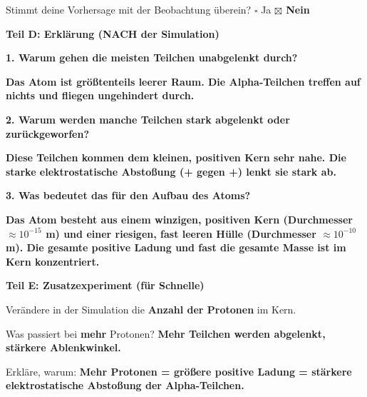 \documentclass[10pt, a4paper]{article}
\newcommand{\fachfarbe}{physik}
\newcommand{\lsg}[1]{\textcolor{loesung}{\textbf{#1}}}
\newcommand{\abschnitt}[1]{%
    \vspace{8pt}
    \noindent\textbf{\textcolor{\fachfarbe}{#1}}
    \vspace{4pt}
}
\begin{document}
\vspace{8pt}

Stimmt deine Vorhersage mit der Beobachtung überein? $\square$ Ja \quad \lsg{$\boxtimes$ Nein}

\vspace{8pt}


\abschnitt{Teil D: Erklärung (NACH der Simulation)}

\textbf{1. Warum gehen die meisten Teilchen unabgelenkt durch?}

\vspace{4pt}
\lsg{Das Atom ist größtenteils leerer Raum. Die Alpha-Teilchen treffen auf nichts und fliegen ungehindert durch.}

\vspace{8pt}

\textbf{2. Warum werden manche Teilchen stark abgelenkt oder zurückgeworfen?}

\vspace{4pt}
\lsg{Diese Teilchen kommen dem kleinen, positiven Kern sehr nahe. Die starke elektrostatische Abstoßung (+ gegen +) lenkt sie stark ab.}

\vspace{8pt}

\textbf{3. Was bedeutet das für den Aufbau des Atoms?}

\vspace{4pt}
\lsg{Das Atom besteht aus einem winzigen, positiven Kern (Durchmesser $\approx 10^{-15}$ m) und einer riesigen, fast leeren Hülle (Durchmesser $\approx 10^{-10}$ m). Die gesamte positive Ladung und fast die gesamte Masse ist im Kern konzentriert.}

\vspace{12pt}


\abschnitt{Teil E: Zusatzexperiment (für Schnelle)}

Verändere in der Simulation die \textbf{Anzahl der Protonen} im Kern.

\vspace{6pt}

Was passiert bei \textbf{mehr} Protonen? \lsg{Mehr Teilchen werden abgelenkt, stärkere Ablenkwinkel.}

\vspace{6pt}

Erkläre, warum: \lsg{Mehr Protonen = größere positive Ladung = stärkere elektrostatische Abstoßung der Alpha-Teilchen.}
\end{document}
